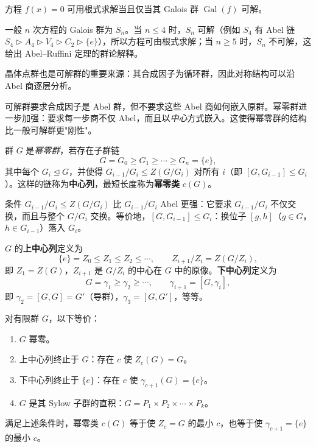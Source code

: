 \begin{note}
方程 $f(x)=0$ 可用根式求解当且仅当其 Galois 群 $\operatorname{Gal}(f)$ 可解。

一般 $n$ 次方程的 Galois 群为 $S_n$。当 $n\le4$ 时，$S_n$ 可解（例如 $S_4$ 有 Abel 链 $S_4\rhd A_4\rhd V_4\rhd C_2\rhd\{e\}$），所以方程可由根式求解；当 $n\ge5$ 时，$S_n$ 不可解，这给出 Abel--Ruffini 定理的群论解释。

晶体点群也是可解群的重要来源：其合成因子为循环群，因此对称结构可以沿 Abel 商逐层分析。

\end{note}

可解群要求合成因子是 Abel 群，但不要求这些 Abel 商如何嵌入原群。幂零群进一步加强：要求每一步商不仅 Abel，而且以\emph{中心}方式嵌入。这使得幂零群的结构比一般可解群更"刚性"。

\begin{definition}[幂零群与中心列]
群 $G$ 是\emph{幂零群}，若存在子群链
\[
G=G_0\ge G_1\ge\cdots\ge G_n=\{e\},
\]
其中每个 $G_i\mathrel{\trianglelefteq}G$，并使得 $G_{i-1}/G_i\le Z(G/G_i)$ 对所有 $i$（即 $[G,G_{i-1}]\le G_i$）。这样的链称为\textbf{中心列}，最短长度称为\textbf{幂零类} $c(G)$。
\end{definition}

条件 $G_{i-1}/G_i\le Z(G/G_i)$ 比 $G_{i-1}/G_i$ Abel 更强：它要求 $G_{i-1}/G_i$ 不仅交换，而且与整个 $G/G_i$ 交换。等价地，$[G,G_{i-1}]\le G_i$：换位子 $[g,h]$（$g\in G$，$h\in G_{i-1}$）落入 $G_i$。

\begin{definition}[上中心列与下中心列]
$G$ 的\textbf{上中心列}定义为
\[
\{e\}=Z_0\le Z_1\le Z_2\le\cdots,\qquad Z_{i+1}/Z_i=Z(G/Z_i),
\]
即 $Z_1=Z(G)$，$Z_{i+1}$ 是 $G/Z_i$ 的中心在 $G$ 中的原像。\textbf{下中心列}定义为
\[
G=\gamma_1\ge\gamma_2\ge\cdots,\qquad\gamma_{i+1}=[G,\gamma_i],
\]
即 $\gamma_2=[G,G]=G'$（导群），$\gamma_3=[G,G']$，等等。
\end{definition}

\begin{theorem}[幂零群的等价刻画]
\label{thm:nilpotent-equivalent}
对有限群 $G$，以下等价：
\begin{enumerate}[label=(\roman*),leftmargin=3em]
\item $G$ 幂零。
\item 上中心列终止于 $G$：存在 $c$ 使 $Z_c(G)=G$。
\item 下中心列终止于 $\{e\}$：存在 $c$ 使 $\gamma_{c+1}(G)=\{e\}$。
\item $G$ 是其 Sylow 子群的直积：$G=P_1\times P_2\times\cdots\times P_k$。
\end{enumerate}
满足上述条件时，幂零类 $c(G)$ 等于使 $Z_c=G$ 的最小 $c$，也等于使 $\gamma_{c+1}=\{e\}$ 的最小 $c$。
\end{theorem}

